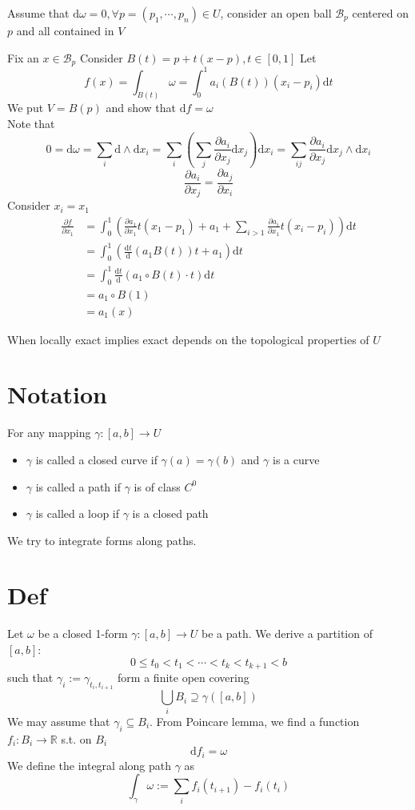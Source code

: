 \documentclass{book}
\begin{document}
Assume that $\text{d}\omega=0,\forall p=(p_1,\cdots,p_n)\in U$, consider an open ball $\mathcal{B}_p$ centered on $p$ and all contained in $V$

Fix an $x\in \mathcal{B}_p$ Consider $B(t)=p+t(x-p),t\in [0,1]$ Let
$$f(x)=\int_{B(t)}\omega=\int_0^1a_i(B(t))(x_i-p_i)\text{d}t$$
We put $V=B(p)$ and show that $\text{d}f=\omega$\\
Note that
$$0=\text{d}\omega=\sum\limits_i\text{d}\wedge\text{d}x_i=\sum\limits_i\left(\sum\limits_j\frac{\partial a_i}{\partial x_j}\text{d}x_j\right)\text{d}x_i=\sum\limits_{ij}\frac{\partial a_i}{\partial x_j}\text{d}x_j\wedge\text{d}x_i$$
$$\frac{\partial a_i}{\partial x_j}=\frac{\partial a_j}{\partial x_i}$$
Consider $x_i=x_1$
$$\begin{aligned}
    \frac{\partial f}{\partial x_1}&=\int_0^1\left(\frac{\partial a_1}{\partial x_1}t(x_1-p_1)+a_1+\sum\limits_{i>1}\frac{\partial a_i}{\partial x_1}t(x_i-p_i)\right)\text{d}t\\
    &=\int_0^1\left(\frac{\text{d}t}{\text{d}}(a_1B(t))t+a_1\right)\text{d}t\\
    &=\int_0^1\frac{\text{d}t}{\text{d}}\left(a_1\circ B(t)\cdot t\right)\text{d}t\\
    &=a_1\circ B(1)\\
    &=a_1(x)
\end{aligned}$$

When locally exact implies exact depends on the topological properties of $U$
\section{Notation}
For any mapping $\gamma:[a,b]\rightarrow U$
\begin{itemize}
    \item $\gamma$ is called a closed curve if $\gamma(a)=\gamma(b)$ and $\gamma$ is a curve
    \item $\gamma$ is called a path if $\gamma$ is of class $C^0$
    \item $\gamma$ is called a loop if $\gamma$ is a closed path
\end{itemize}
We try to integrate forms along paths.
\section{Def}
Let $\omega$ be a closed 1-form $\gamma:[a,b]\rightarrow U$ be a path. We derive a partition of $[a,b]:$$$0\leq t_0<t_1<\cdots<t_k<t_{k+1}<b$$ such that $\gamma_i:=\gamma_{t_i,t_{i+1}}$ form a finite open covering$$\bigcup\limits_i B_i\supseteq\gamma([a,b])$$
We may assume that $\gamma_i\subseteq B_i$. From Poincare lemma, we find a function $f_i:B_i\rightarrow\mathbb{R}$ s.t. on $B_i$$$\text{d}f_i=\omega$$
We define the integral along path $\gamma$ as $$\int_\gamma\omega:=\sum\limits_if_i(t_{i+1})-f_i(t_i)$$
\end{document}
